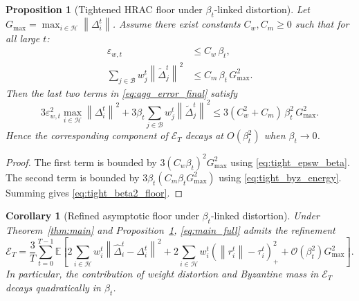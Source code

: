 \documentclass[11pt,a4paper]{article}
\newtheorem{corollary}{Corollary}
\newtheorem{proposition}{Proposition}
\theoremstyle{remark}
\newcommand{\E}{\mathbb{E}}
\newcommand{\HH}{\mathcal{H}}
\newcommand{\BB}{\mathcal{B}}
\newcommand{\norm}[1]{\left\lVert #1 \right\rVert}
\begin{document}
\begin{proposition}[Tightened HRAC floor under \(\beta_t\)-linked distortion]
\label{prop:tight_floor_beta2}
Let $G_{\max} = \max_{i\in\HH}\norm{\Delta_i^t}$. Assume there exist constants \(C_w,C_m\ge 0\) such that for all large
\(t\):
\begin{align}
    \varepsilon_{w,t} &\le C_w\,\beta_t,
    \label{eq:tight_epsw_beta}\\
    \sum_{j\in\BB} w_j^t \norm{\tilde{\Delta}_j^t}^2
    &\le C_m\,\beta_t\,G_{\max}^2.
    \label{eq:tight_byz_energy}
\end{align}
Then the last two terms in \eqref{eq:agg_error_final} satisfy
\begin{equation}
    3\varepsilon_{w,t}^2 \max_{i\in\HH}\norm{\Delta_i^t}^2
    +
    3\beta_t \sum_{j\in\BB} w_j^t \norm{\tilde{\Delta}_j^t}^2
    \le
    3(C_w^2+C_m)\,\beta_t^2\,G_{\max}^2.
    \label{eq:tight_beta2_floor}
\end{equation}
Hence the corresponding component of \(\mathcal E_T\) decays at
\(O(\beta_t^2)\) when \(\beta_t\to 0\).
\end{proposition}

\begin{proof}
The first term is bounded by
\(
3(C_w\beta_t)^2 G_{\max}^2
\)
using \eqref{eq:tight_epsw_beta}.
The second term is bounded by
\(
3\beta_t(C_m\beta_t G_{\max}^2)
\)
using \eqref{eq:tight_byz_energy}. Summing gives
\eqref{eq:tight_beta2_floor}.
\end{proof}

\begin{corollary}[Refined asymptotic floor under \(\beta_t\)-linked distortion]
\label{cor:refined_beta2_floor}
Under Theorem~\ref{thm:main} and Proposition~\ref{prop:tight_floor_beta2},
\eqref{eq:main_full} admits the refinement
\[
    \mathcal{E}_T
    =
    \frac{3}{T}\sum_{t=0}^{T-1}\E\!\left[
        2\sum_{i\in\HH} w_i^t \norm{\hat{\Delta}_i^t-\Delta_i^t}^2
        +2\sum_{i\in\HH} w_i^t(\norm{r_i^t}-\tau_i^t)_+^2
        +\mathcal{O}(\beta_t^2)G_{\max}^2
    \right].
\]
In particular, the contribution of weight distortion and Byzantine mass in
\(\mathcal{E}_T\) decays quadratically in \(\beta_t\).
\end{corollary}
\end{document}
